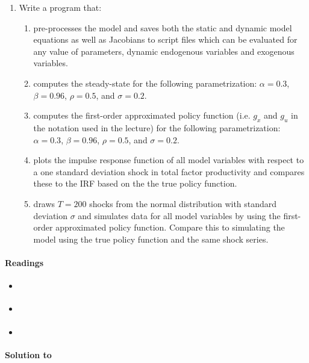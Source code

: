 \begin{enumerate}
\item Write a program that:
\begin{enumerate}
	\item pre-processes the model and saves both the static and dynamic model equations as well as Jacobians to script files
	  which can be evaluated for any value of parameters, dynamic endogenous variables and exogenous variables.
	\item computes the steady-state for the following parametrization: $\alpha=0.3$, $\beta=0.96$, $\rho=0.5$, and $\sigma=0.2$.
	\item computes the first-order approximated policy function (i.e. $g_x$ and $g_u$ in the notation used in the lecture) for the following parametrization:
	  $\alpha=0.3$, $\beta=0.96$, $\rho=0.5$, and $\sigma=0.2$.
	\item plots the impulse response function of all model variables with respect to a one standard deviation shock in total factor productivity
	and compares these to the IRF based on the the true policy function.
	\item draws $T=200$ shocks from the normal distribution with standard deviation $\sigma$ and simulates data for all model variables
	by using the first-order approximated policy function.
	Compare this to simulating the model using the true policy function and the same shock series.
\end{enumerate}

\end{enumerate}

\paragraph{Readings}
\begin{itemize}
	\item \textcite{Brock.Mirman_1972_OptimalEconomicGrowth}
	\item \textcite[Ch.~5]{Hansen.Sargent_2013_RecursiveModelsDynamic}
	\item \textcite[Ch.~3.1.2]{Ljungqvist.Sargent_2018_RecursiveMacroeconomicTheory}
\end{itemize}

\begin{solution}\textbf{Solution to }
\ifDisplaySolutions

\fi
\newpage
\end{solution}